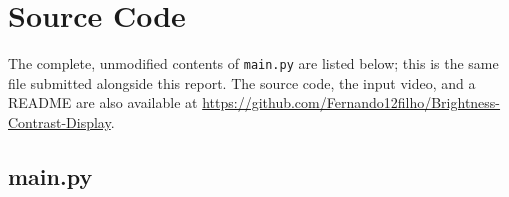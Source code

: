 \appendix
{}
%


\chapter{Source Code}
\label{app:source}

The complete, unmodified contents of \texttt{main.py} are listed
below; this is the same file submitted alongside this report. The
source code, the input video, and a README are also available at
\url{https://github.com/Fernando12filho/Brightness-Contrast-Display}.

\section{main.py}
\label{app:mainpy}


